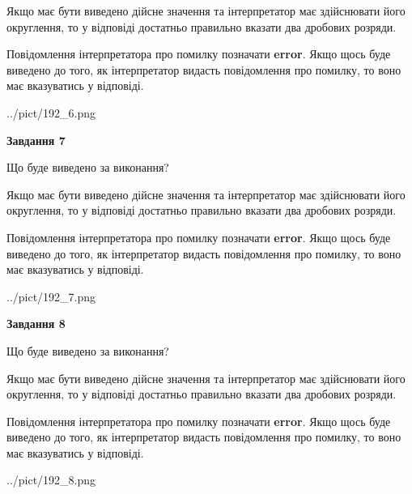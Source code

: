 \documentclass[12pt, ukrainian]{article}
\begin{document}
{\begin {Large}
Якщо має бути виведено дійсне значення та інтерпретатор має здійснювати його округлення, 
то у відповіді достатньо правильно вказати два дробових розряди.

Повідомлення інтерпретатора про помилку позначати \textbf{error}.
Якщо щось буде виведено до того, як інтерпретатор видасть повідомлення про помилку, 
то воно має вказуватись у відповіді. \par

\begin{center}
	{../pict/192_6.png}
\end{center}
\newpage

{\begin {center}\textbf{Завдання 7}\end {center}}\par
Що буде виведено за виконання? \par

Якщо має бути виведено дійсне значення та інтерпретатор має здійснювати його округлення, 
то у відповіді достатньо правильно вказати два дробових розряди.

Повідомлення інтерпретатора про помилку позначати \textbf{error}.
Якщо щось буде виведено до того, як інтерпретатор видасть повідомлення про помилку, 
то воно має вказуватись у відповіді. \par

\begin{center}
	{../pict/192_7.png}
\end{center}
\newpage

{\begin {center}\textbf{Завдання 8}\end {center}}\par
Що буде виведено за виконання? \par

Якщо має бути виведено дійсне значення та інтерпретатор має здійснювати його округлення, 
то у відповіді достатньо правильно вказати два дробових розряди.

Повідомлення інтерпретатора про помилку позначати \textbf{error}.
Якщо щось буде виведено до того, як інтерпретатор видасть повідомлення про помилку, 
то воно має вказуватись у відповіді. \par

\begin{center}
	{../pict/192_8.png}
\end{center}
\newpage


\end{Large}}
\end{document}
